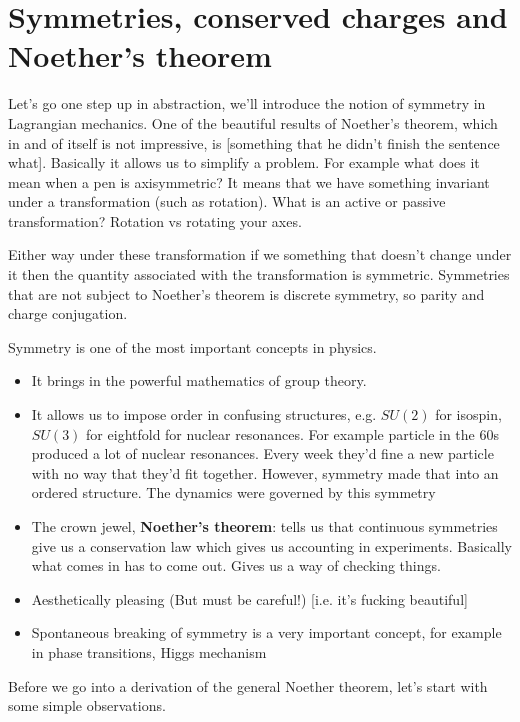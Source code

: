 \documentclass[12pt]{article} %
\begin{document}
\section{Symmetries, conserved charges and Noether's theorem}

Let's go one step up in abstraction, we'll introduce the notion of symmetry in Lagrangian mechanics. One of the beautiful results of Noether's theorem, which in and of itself is not impressive, is [something that he didn't finish the sentence what]. Basically it allows us to simplify a problem. For example what does it mean when a pen is axisymmetric? It means that we have something invariant under a transformation (such as rotation). What is an active or passive transformation? Rotation vs rotating your axes. 

Either way under these transformation if we something that doesn't change under it then the quantity associated with the transformation is symmetric. Symmetries that are not subject to Noether's theorem is discrete symmetry, so parity and charge conjugation. 


Symmetry is one of the most important concepts in physics. 
\begin{itemize}
\item It brings in the powerful mathematics of group theory. 
\item It allows us to impose order in confusing structures, e.g. $SU(2)$ for isospin, $SU(3)$ for eightfold for nuclear resonances. For example particle in the 60s produced a lot of nuclear resonances. Every week they'd fine a new particle with no way that they'd fit together. However, symmetry made that into an ordered structure. The dynamics were governed by this symmetry
\item The crown jewel, \textbf{Noether's theorem}: tells us that continuous symmetries give us a conservation law which gives us accounting in experiments. Basically what comes in has to come out. Gives us a way of checking things. 
\item Aesthetically pleasing (But must be careful!) [i.e. it's fucking beautiful]
\item Spontaneous breaking of symmetry is a very important concept, for example in phase transitions, Higgs mechanism
\end{itemize}

Before we go into a derivation of the general Noether theorem, let's start with some simple observations.
\end{document}
